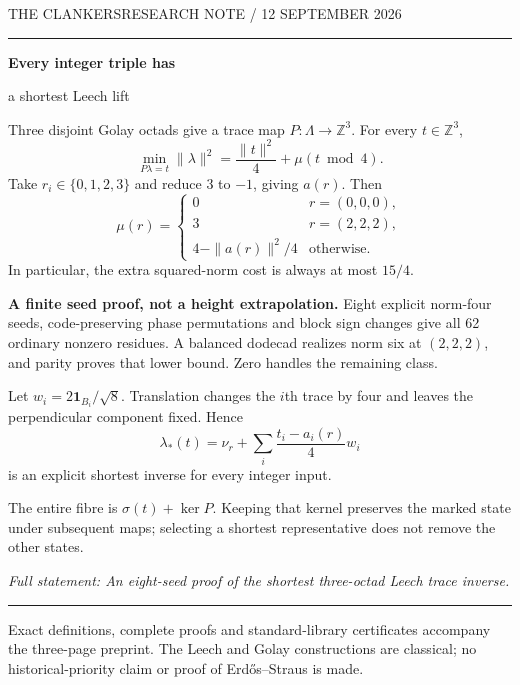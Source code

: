 \documentclass[12pt]{article}
\begin{document}
{\small THE CLANKERS\hfill RESEARCH NOTE / 12 SEPTEMBER 2026}\par\vspace{8pt}\hrule\vspace{15pt}

{\LARGE\bfseries Every integer triple has\par a shortest Leech lift}\par\vspace{8pt}
Three disjoint Golay octads give a trace map $P:\Lambda\to\mathbb Z^3$. For every $t\in\mathbb Z^3$,
\[
\boxed{\displaystyle
\min_{P\lambda=t}\|\lambda\|^2
=\frac{\|t\|^2}{4}+\mu(t\bmod4).}
\]
Take $r_i\in\{0,1,2,3\}$ and reduce $3$ to $-1$, giving $a(r)$. Then
\[
\boxed{\displaystyle
\mu(r)=\begin{cases}
0&r=(0,0,0),\\
3&r=(2,2,2),\\
4-\|a(r)\|^2/4&\text{otherwise}.
\end{cases}}
\]
In particular, the extra squared-norm cost is always at most $15/4$.

\textbf{A finite seed proof, not a height extrapolation.} Eight explicit norm-four seeds, code-preserving phase permutations and block sign changes give all 62 ordinary nonzero residues. A balanced dodecad realizes norm six at $(2,2,2)$, and parity proves that lower bound. Zero handles the remaining class.

Let $w_i=2\mathbf1_{B_i}/\sqrt8$. Translation changes the $i$th trace by four and leaves the perpendicular component fixed. Hence
\[
\lambda_*(t)=\nu_r+\sum_i\frac{t_i-a_i(r)}4w_i
\]
is an explicit shortest inverse for every integer input.

The entire fibre is $\sigma(t)+\ker P$. Keeping that kernel preserves the marked state under subsequent maps; selecting a shortest representative does not remove the other states.

\textit{Full statement: An eight-seed proof of the shortest three-octad Leech trace inverse.}
\vfill\hrule\vspace{6pt}
{\footnotesize Exact definitions, complete proofs and standard-library certificates accompany the three-page preprint. The Leech and Golay constructions are classical; no historical-priority claim or proof of Erd\H{o}s--Straus is made.}
\end{document}
